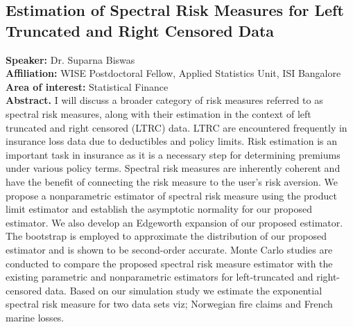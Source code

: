 \subsection*{Estimation of Spectral Risk Measures for Left Truncated and Right Censored Data} %
\noindent
\textbf{Speaker:} Dr. Suparna Biswas \\ %
\textbf{Affiliation:} WISE Postdoctoral Fellow, Applied Statistics Unit, ISI Bangalore \\ %
\textbf{Area of interest:} Statistical Finance \\ 

\noindent\textbf{Abstract.} I will discuss a broader category of risk measures referred to as spectral risk measures, along with their estimation in the context of left truncated and right censored (LTRC) data. LTRC are encountered frequently in insurance loss data due to deductibles and policy limits. Risk estimation is an important task in insurance as it is a necessary step for determining premiums under various policy terms. Spectral risk measures are inherently coherent and have the benefit of connecting the risk measure to the user's risk aversion. We propose a nonparametric estimator of spectral risk measure using the product limit estimator and establish the asymptotic normality for our proposed estimator. We also develop an Edgeworth expansion of our proposed estimator. The bootstrap is employed to approximate the distribution of our proposed estimator and is shown to be second-order accurate. Monte Carlo studies are conducted to compare the proposed spectral risk measure estimator with the existing parametric and nonparametric estimators for left-truncated and right-censored data. Based on our simulation study we estimate the exponential spectral risk measure for two data sets viz; Norwegian fire claims and French marine losses.


